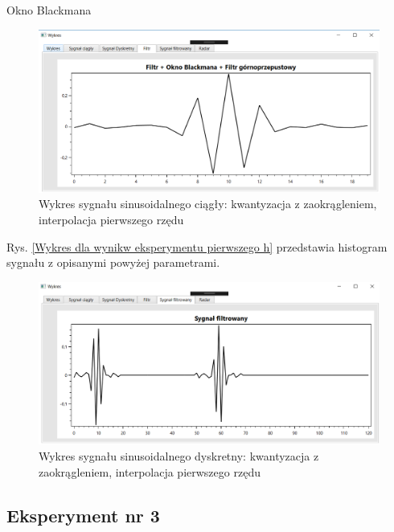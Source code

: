 \documentclass[12pt]{article}
\begin{document}
\newpage
Okno Blackmana
\begin{figure}[h!]
 \centering
 \includegraphics[width=12.3cm]{prostFGOB.PNG}
 \vspace{-0.3cm}
 \caption{Wykres sygnału sinusoidalnego ciągły: kwantyzacja z zaokrągleniem, interpolacja pierwszego rzędu}
 \label{Wykres dla wyników eksperymentu drugiego}
\end{figure}
\newpage
Rys. \ref{Wykres dla wynikw eksperymentu pierwszego h} przedstawia histogram sygnału z opisanymi powyżej parametrami. 
\begin{figure}[h!]
 \centering
 \includegraphics[width=12.3cm]{prostSFGB.PNG}
 \vspace{-0.3cm}
 \caption{Wykres sygnału sinusoidalnego dyskretny: kwantyzacja z zaokrągleniem, interpolacja pierwszego rzędu}
 \label{Histogram dla wyników eksperymentu drugiego}
\end{figure}



\subsection{Eksperyment nr 3}
\end{document}

